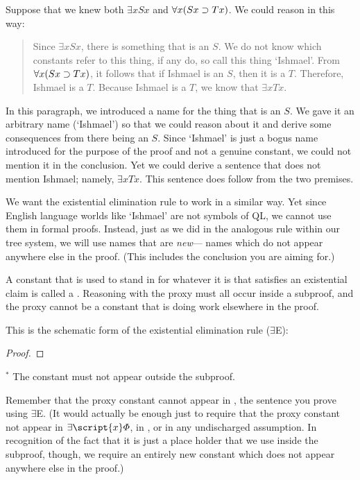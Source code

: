 Suppose that we knew both $\exists x Sx$ and $\forall x(Sx \supset Tx)$. We could reason in this way:
\begin{quote}
Since $\exists x Sx$, there is something that is an $S$. We do not know which constants refer to this thing, if any do, so call this thing `Ishmael'. From $\forall x(Sx \supset Tx)$, it follows that if Ishmael is an $S$, then it is a $T$. Therefore, Ishmael is a $T$.  Because Ishmael is a $T$, we know that $\exists x Tx$.
\end{quote}
In this paragraph, we introduced a name for the thing that is an $S$. We gave it an arbitrary name (`Ishmael') so that we could reason about it and derive some consequences from there being an $S$. Since `Ishmael' is just a bogus name introduced for the purpose of the proof and not a genuine constant, we could not mention it in the conclusion. Yet we could derive a sentence that does not mention Ishmael; namely, $\exists x Tx$. This sentence does follow from the two premises.

We want the existential elimination rule to work in a similar way. Yet since English language worlds like `Ishmael' are not symbols of QL, we cannot use them in formal proofs. Instead, just as we did in the analogous rule within our tree system, we will use names that are \emph{new}--- names which do not appear anywhere else in the proof. (This includes the conclusion you are aiming for.)

A constant that is used to stand in for whatever it is that satisfies an existential claim is called a . Reasoning with the proxy must all occur inside a subproof, and the proxy cannot be a constant that is doing work elsewhere in the proof.

This is the schematic form of the existential elimination rule ($\exists$E): 

\begin{proof}
	\open	
		 
	\close
	 
\end{proof}
$^\ast$ The constant  must not appear outside the subproof.

Remember that the proxy constant cannot appear in \metaB{}, the sentence you prove using $\exists$E. (It would actually be enough just to require that the proxy constant not appear in $\exists\script{x}\metaA{}$, in \metaB{}, or in any undischarged assumption. In recognition of the fact that it is just a place holder that we use inside the subproof, though, we require an entirely new constant which does not appear anywhere else in the proof.)

